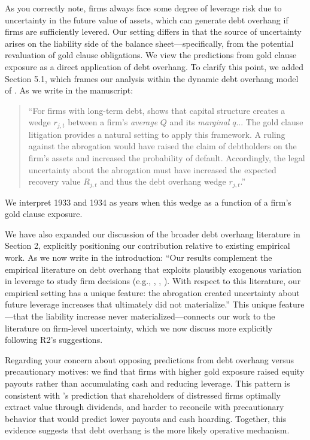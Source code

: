 As you correctly note, firms always face some degree of leverage risk due to uncertainty in the future value of assets, which can generate debt overhang if firms are sufficiently levered. Our setting differs in that the source of uncertainty arises on the liability side of the balance sheet---specifically, from the potential revaluation of gold clause obligations. We view the predictions from gold clause exposure as a direct application of debt overhang. To clarify this point, we added Section 5.1, which frames our analysis within the dynamic debt overhang model of \cite{Hennessy2004}. As we write in the manuscript:

\begin{quote}
``For firms with long-term debt, \cite{Hennessy2004} shows that capital structure creates a wedge $r_{j,t}$ between a firm's \textit{average} $Q$ and its \textit{marginal} $q$... The gold clause litigation provides a natural setting to apply this framework. A ruling against the abrogation would have raised the claim of debtholders on the firm's assets and increased the probability of default. Accordingly, the legal uncertainty about the abrogation must have increased the expected recovery value $R_{j,t}$ and thus the debt overhang wedge $r_{j,t}$.''
\end{quote}

We interpret 1933 and 1934 as years when this wedge as a function of a firm's gold clause exposure. 

We have also expanded our discussion of the broader debt overhang literature in Section 2, explicitly positioning our contribution relative to existing empirical work. As we now write in the introduction: ``Our results complement the empirical literature on debt overhang that exploits plausibly exogenous variation in leverage to study firm decisions (e.g., \cite{Giroud2012}, \cite{Wittry2018}, \cite{Bennett2025}). With respect to this literature, our empirical setting has a unique feature: the abrogation created uncertainty about future leverage increases that ultimately did not materialize.'' This unique feature---that the liability increase never materialized---connects our work to the literature on firm-level uncertainty, which we now discuss more explicitly following R2's suggestions.

Regarding your concern about opposing predictions from debt overhang versus precautionary motives: we find that firms with higher gold exposure raised equity payouts rather than accumulating cash and reducing leverage. This pattern is consistent with \cite{Hennessy2004}'s prediction that shareholders of distressed firms optimally extract value through dividends, and harder to reconcile with precautionary behavior that would predict lower payouts and cash hoarding. Together, this evidence suggests that debt overhang is the more likely operative mechanism.
